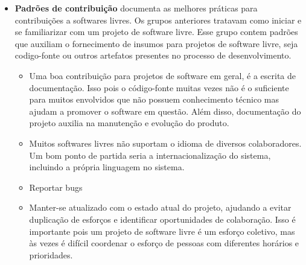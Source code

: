 \begin{itemize}
\item \textbf{Padrões de contribuição} documenta as melhores práticas para contribuições a softwares livres. Os grupos anteriores tratavam como iniciar e se familiarizar com um projeto de software livre. Esse grupo contem padrões que auxiliam o fornecimento de insumos para projetos de software livre, seja codigo-fonte ou outros artefatos presentes no processo de desenvolvimento.
	\begin{itemize}
	\item Uma boa contribuição para projetos de software em geral, é a escrita de documentação. Isso pois o código-fonte muitas vezes não é o suficiente para muitos envolvidos que não possuem conhecimento técnico mas ajudam a promover o software em questão. Além disso, documentação do projeto auxilia na manutenção e evolução do produto.
	\item Muitos softwares livres não suportam o idioma de diversos colaboradores. Um bom ponto de partida seria a internacionalização do sistema, incluindo a própria linguagem no sistema.
	\item Reportar bugs 
	\item Manter-se atualizado com o estado atual do projeto, ajudando a evitar duplicação de esforços e identificar oportunidades de colaboração. Isso é importante pois um projeto de software livre é um esforço coletivo, mas às vezes é difícil coordenar o esforço de pessoas com diferentes horários e prioridades.
	\end{itemize}
\end{itemize}

















